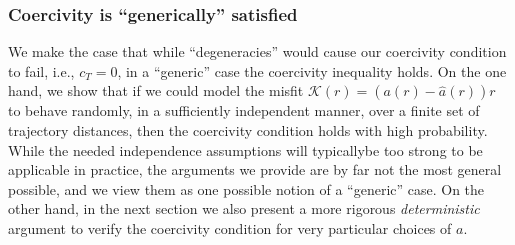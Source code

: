 \subsubsection{Coercivity is ``generically'' satisfied}\label{randomod}
We make the case that while ``degeneracies'' would cause our coercivity condition to fail, i.e., $c_T=0$, in a ``generic'' case the coercivity inequality holds.
On the one hand, we show that if we could model the misfit $\mathcal K(r)=(a(r)- \widehat a(r))r$ to behave randomly, in a sufficiently independent manner, over a finite set of trajectory distances, then
the coercivity condition holds with high probability. While the needed independence assumptions will typicallybe  too strong to be applicable in practice, the arguments we provide are by far not the most general possible, and we view them as one possible notion of a ``generic'' case.
On the other hand, in the next section we also present a more rigorous {\it deterministic} argument to verify the coercivity condition for very particular choices of $a$.


